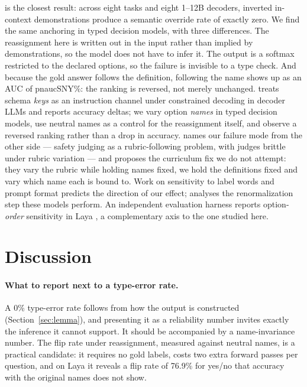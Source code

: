 \documentclass[11pt]{article}
\newcommand{\m}[1]{\csname pn#1\endcsname}       %
\newcommand{\opt}[1]{\textsf{#1}}          %
\begin{document}
\citet{kumar2025anchors} is the closest result: across eight tasks and eight 1--12B decoders,
inverted in-context demonstrations produce a semantic override rate of exactly zero. We find the
same anchoring in typed decision models, with three differences. The reassignment here is written
out in the input rather than implied by demonstrations, so the model does not have to infer it. The
output is a softmax restricted to the declared options, so the failure is invisible to a type check.
And because the gold answer follows the definition, following the name shows up as an AUC of
\m{aucSNY}\%: the ranking is reversed, not merely unchanged. \citet{le2026schemakey} treats schema \emph{keys} as an
instruction channel under constrained decoding in decoder LLMs and reports accuracy deltas; we vary
option \emph{names} in typed decision models, use neutral names as a control for the reassignment
itself, and observe a reversed ranking rather than a drop in accuracy. \citet{lim2026rubric} names our
failure mode from the other side --- safety judging as a rubric-following problem, with judges
brittle under rubric variation --- and proposes the curriculum fix we do not attempt: they vary the
rubric while holding names fixed, we hold the definitions fixed and vary which name each is bound
to. Work on sensitivity to label words and prompt format \citep{sclar2024formatspread,zheng2024mcq,liusie2023wordbias,wei2023flipped}
predicts the direction of our effect; \citet{badhe2026silentvote} analyses the renormalization step
these models perform. An independent evaluation harness reports option-\emph{order} sensitivity in
Laya \citep{ballot2026}, a complementary axis to the one studied here.

\section{Discussion}

\paragraph{What to report next to a type-error rate.} A 0\% type-error rate follows from how the
output is constructed (Section~\ref{sec:lemma}), and presenting it as a reliability number invites exactly the inference it cannot support.
It should be accompanied by a name-invariance number. The flip rate under reassignment, measured
against neutral names, is a practical candidate: it requires no gold labels, costs two extra forward
passes per question, and on Laya it reveals a flip rate of 76.9\% for \opt{yes}/\opt{no} that
accuracy with the original names does not show.
\end{document}
